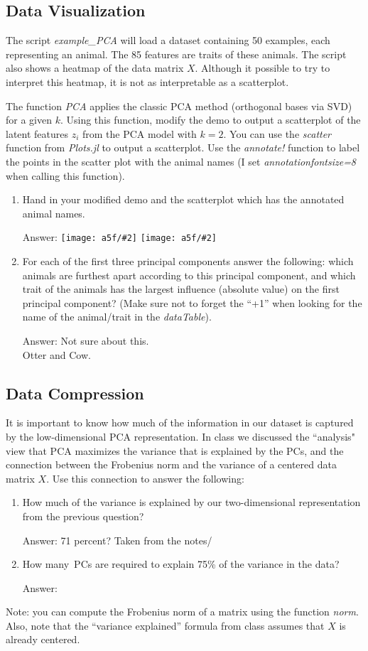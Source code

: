 \documentclass{article}
\def\ans#1{\par\gre{Answer: #1}}
\def\blu#1{{\color{blu}#1}}
\def\gre#1{{\color{gre}#1}}
\newcommand{\fig}[2]{\texttt{[image: a5f/\#2]}}
\def\enum#1{\begin{enumerate}#1\end{enumerate}}
\begin{document}
\subsection{Data Visualization}

The script \emph{example\_PCA} will load a dataset containing 50 examples, each representing an animal. The 85 features are traits of these animals. The script also shows a heatmap of the data matrix $X$. Although it possible to try to interpret this heatmap, it is not as interpretable as a scatterplot.

The function \emph{PCA} applies the classic PCA method (orthogonal bases via SVD) for a given $k$. Using this function, modify the demo to output a scatterplot of the latent features $z_i$ from the PCA model with $k=2$. You can use the \emph{scatter} function from \emph{Plots.jl} to output a scatterplot. Use the \emph{annotate!} function to label the points in the scatter plot with the animal names (I set \emph{annotationfontsize=8} when calling this function).
\blu{
\enum{
\item  Hand in your modified demo and the scatterplot which has the annotated animal names.
\ans{
\fig{.4}{Q3.2}
\fig{.4}{Q3.2 Code}
}
\pagebreak
\item For each of the first three principal components answer the following: which animals are furthest apart according to this principal component, and which trait of the animals has the largest influence (absolute value) on the first principal component? (Make sure not to forget the ``+1'' when looking for the name of the animal/trait in the \emph{dataTable}).
\ans{Not sure about this.\\
Otter and Cow.}
}
}

\pagebreak

\subsection{Data Compression}

It is important to know how much of the information in our dataset is captured by the low-dimensional PCA representation.
In class we discussed the ``analysis" view that PCA maximizes the variance that is explained by the PCs, and the connection between the Frobenius norm and the variance of a centered data matrix $X$. Use this connection to answer the following:
\blu{\enum{
\item How much of the variance is explained by our two-dimensional representation from the previous question?
\ans{71 percent? Taken from the notes/}
\item How many\ PCs are required to explain 75\% of the variance in the data?
\ans{}
}}
Note: you can compute the Frobenius norm of a matrix using the function \emph{norm}. Also, note that the ``variance explained'' formula from class assumes that $X$ is already centered.
\end{document}
